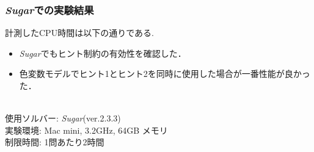 \documentclass [dvipdfmx,12pt]{beamer}
\newcommand{\backupend}{
\addtocounter{framenumberappendix}{-\value{framenumber}}
\addtocounter{framenumber}{\value{framenumberappendix}}
}
\begin{document}
\begin{frame}
\frametitle{\textit{Sugar}での実験結果}
計測したCPU時間は以下の通りである.
\begin{block}{}
    {\tiny  }
\end{block}
\begin{itemize}
\item \textit{Sugar}でもヒント制約の有効性を確認した．
\item 色変数モデルでヒント1とヒント2を同時に使用した場合が一番性能が良かった．
\end{itemize}
\\
{\footnotesize
使用ソルバー: \textit{Sugar}(ver.2.3.3)\\
実験環境: Mac mini, 3.2GHz, 64GB メモリ\\
制限時間: 1問あたり2時間\\
}
\end{frame}

\backupend
\end{document}
